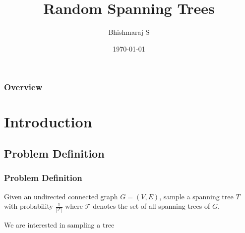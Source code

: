 \documentclass{beamer}
\title[Random Spanning Trees]{Random Spanning Trees} %
\author{Bhishmaraj S} %
\institute[CMI] %
{
Chennai Mathematical Institute \\ %
\medskip
\textit{bhishma@cmi.ac.in} %
}
\date{\today} %
\begin{document}
\begin{frame}
\titlepage %
\end{frame}

\begin{frame}
\frametitle{Overview} %
\tableofcontents %
\end{frame}


\section{Introduction} %

\subsection{Problem Definition} %

\begin{frame}
\frametitle{Problem Definition}

 Given an undirected connected graph $G = (V, E)$, sample a spanning tree $T$ with probability $\frac{1}{|\mathcal{T}|}$ where $\mathcal{T}$ denotes the set of all spanning trees of $G$. 
 
 We are interested in sampling a tree 
%  



\end{frame}
\end{document}

